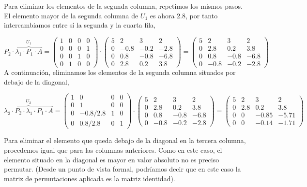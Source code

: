 Para eliminar los elementos de la segunda columna, repetimos los mismos pasos. El elemento mayor de la segunda columna de $U_1$ es ahora $2.8$, por tanto intercambiamos entre sí la segunda y la cuarta fila,

\begin{equation*}
P_2\cdot \overbrace{\lambda_1 \cdot P_1\cdot A}^{U_1}=\begin{pmatrix}
1& 0& 0& 0\\
0& 0& 0& 1\\
0& 0& 1& 0\\
0& 1& 0&0
\end{pmatrix} \cdot \begin{pmatrix}
5& 2& 3& 2\\
0& -0.8& -0.2& -2.8\\
0& 0.8& -0.8& -6.8\\
0& 2.8& 0.2&3.8
\end{pmatrix}= \begin{pmatrix}
5& 2& 3& 2\\
0& 2.8& 0.2&3.8\\
0& 0.8& -0.8& -6.8\\
0& -0.8& -0.2& -2.8
\end{pmatrix}
\end{equation*}
A continuación, eliminamos los elementos de la segunda columna situados por debajo de la diagonal,

\begin{equation*}
\overbrace{\lambda_2\cdot P_2\cdot \lambda_1 \cdot P_1\cdot A}^{U_2}=\begin{pmatrix}
1& 0& 0& 0\\
0& 1& 0& 0\\
0& -0.8/2.8& 1& 0\\
0& 0.8/2.8& 0&1
\end{pmatrix} \cdot \begin{pmatrix}
5& 2& 3& 2\\
0& 2.8& 0.2&3.8\\
0& 0.8& -0.8& -6.8\\
0& -0.8& -0.2& -2.8
\end{pmatrix} = \begin{pmatrix}
5& 2& 3& 2\\
0& 2.8& 0.2&3.8\\
0& 0& -0.85& -5.71\\
0& 0& -0.14& -1.71
\end{pmatrix}
\end{equation*}

Para eliminar el elemento que queda debajo de la diagonal en la tercera columna, procedemos igual que para las columnas anteriores. Como en este caso, el elemento situado en la diagonal es mayor en valor absoluto no es preciso permutar. (Desde un punto de vista formal, podríamos decir que en este caso la matriz de permutaciones aplicada es la matriz identidad).

